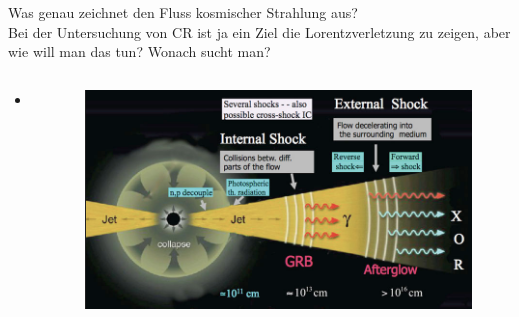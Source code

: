   \begin{frame}{Was genau zeichnet den Fluss kosmischer Strahlung aus?\\
  Bei der Untersuchung von CR ist ja ein Ziel die Lorentzverletzung zu
  zeigen, aber wie will man das tun? Wonach sucht man?}
    \begin{columns}
   \begin{column}{0.5\textwidth}
    \begin{itemize}
      \setlength\itemsep{2em}
      \item .
     \end{itemize}
  \vspace{2em}
  \end{column}
  \begin{column}{0.5\textwidth}
  \begin{figure}
    \centering
    \includegraphics[width=\textwidth]{images/fireball.png}
  \end{figure}
  \end{column}
    \end{columns}
  \end{frame}

